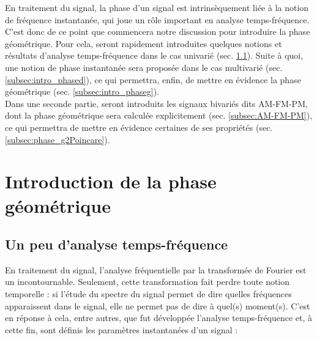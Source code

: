
En traitement du signal, la phase d'un signal est intrinsèquement liée à la notion de fréquence instantanée, qui joue un rôle important en analyse temps-fréquence. 
C'est donc de ce point que commencera notre discussion pour introduire la phase géométrique.
Pour cela, seront rapidement introduites quelques notions et résultats d'analyse temps-fréquence dans le cas univarié (sec. \ref{subsec:ana_temp-freq}). Suite à quoi, une notion de phase instantanée sera proposée dans le cas multivarié (sec. \ref{subsec:intro_phased}), ce qui permettra, enfin, de mettre en évidence la phase géométrique (sec. \ref{subsec:intro_phaseg}).
\\

Dans une seconde partie, seront introduits les signaux bivariés dits AM-FM-PM, dont la phase géométrique sera calculée explicitement (sec. \ref{subsec:AM-FM-PM}), ce qui permettra de mettre en évidence certaines de ses propriétés (sec. \ref{subsec:phase_g2Poincare}). 
\\




\section{Introduction de la phase géométrique} \label{sec:intro_phaseg}

\subsection{Un peu d'analyse temps-fréquence} \label{subsec:ana_temp-freq}

En traitement du signal, l'analyse fréquentielle par la transformée de Fourier est un incontournable. 
Seulement, cette transformation fait perdre toute notion temporelle : si l'étude du spectre du signal permet de dire quelles fréquences apparaissent dans le signal, elle ne permet pas de dire à quel(s) moment(s). 
C'est en réponse à cela, entre autres, que fut développée l'analyse temps-fréquence et, à cette fin, sont définis les paramètres instantanées d'un signal :\par

